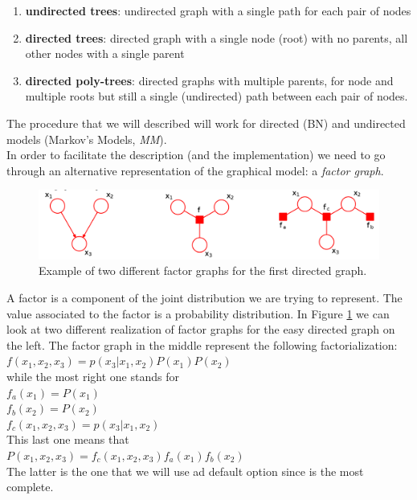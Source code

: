    \begin{enumerate}[label=(\alph*)]
        \item \textbf{undirected trees}: undirected graph with a single path for each pair of nodes
        \item \textbf{directed trees}: directed graph with a single node (root) with no parents, all other nodes with a single parent
        \item \textbf{directed poly-trees}: directed graphs with multiple parents, for node and multiple roots but still a single (undirected) path between each pair of nodes.
    \end{enumerate}
    
    The procedure that we will described will work for directed (BN) and undirected models (Markov's Models, \textit{MM}).\\
    
    In order to facilitate the description (and the implementation) we need to go through an alternative representation of the graphical model: a \textit{factor graph}. 
    \begin{figure}[h]
        \centering
        \includegraphics[scale=0.3]{images/factor_graph.png}
        \caption{Example of two different factor graphs for the first directed graph.}
        \label{fig:factor_graph}
    \end{figure}
    A factor is a component of the joint distribution we are trying to represent. The value associated to the factor is a probability distribution.
    In Figure \ref{fig:factor_graph} we can look at two different realization of factor graphs for the easy directed graph on the left. The factor graph in the middle represent the following factorialization: \\
    $f(x_1, x_2, x_3) = p(x_3|x_1, x_2)P(x_1)P(x_2)$\\
    while the most right one stands for \\
    $f_a(x_1) = P(x_1)$\\
    $f_b(x_2) = P(x_2)$\\
    $f_c(x_1, x_2, x_3) = p(x_3|x_1, x_2)$\\
    This last one means that \\
    $P(x_1, x_2, x_3) = f_c(x_1, x_2, x_3)f_a(x_1)f_b(x_2)$\\
    The latter is the one that we will use ad default option since is the most complete.
    
